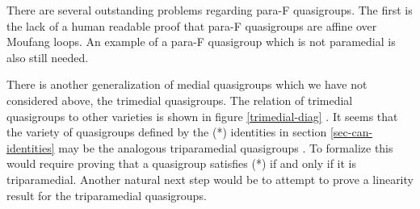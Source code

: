 \documentclass[12pt, twoside, openright]{report}
\theoremstyle{definition}
\begin{document}
There are several outstanding problems regarding para-F quasigroups. The first is the lack of a human
  readable proof that para-F quasigroups are affine over Moufang loops. An example of a para-F quasigroup
  which is not paramedial is also still needed.

There is another generalization of medial quasigroups which we have not considered above, the
  trimedial quasigroups. The relation of trimedial quasigroups to other varieties is shown in
  figure \ref{trimedial-diag} \cite{trimedial}. It seems that the variety of quasigroups defined
  by the (*) identities in section \ref{sec-can-identities} may be the analogous triparamedial
  quasigroups \cite{trimedial}. To formalize this would require proving that a quasigroup satisfies (*)
  if and only if it is triparamedial. Another natural next step would be to attempt to prove a
  linearity result for the triparamedial quasigroups.
\end{document}
